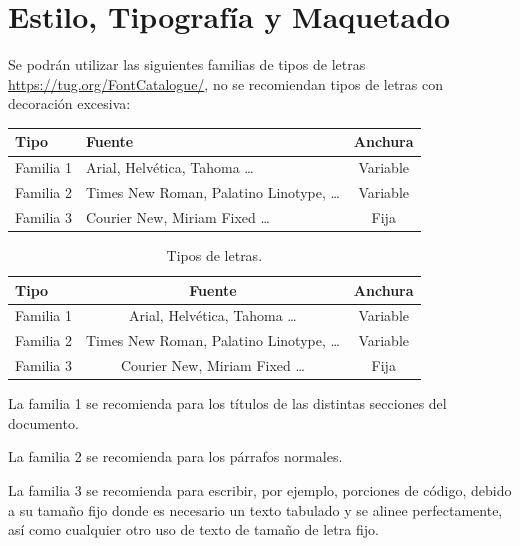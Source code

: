 \section {Estilo,  Tipografía y    Maquetado}

Se podrán utilizar las siguientes familias de tipos de letras \url{https://tug.org/FontCatalogue/}, no se recomiendan tipos de letras con decoración excesiva:

	\begin{center}
	\begin{tabular}{p{2cm}p{7.5cm}c}
		\textbf{Tipo} & \textbf{Fuente} & \textbf{Anchura} \\ \hline
         Familia 1 & Arial, Helvética, Tahoma  	\ldots & Variable \\
         Familia 2 & Times New Roman, Palatino  Linotype,  	\ldots & Variable  \\
         Familia 3 & Courier  New,  Miriam Fixed \ldots & Fija\\
         \hline
	\end{tabular}
	\end{center}



\begin{table} 
	\begin{center}
	\begin{tabular}{l c c}
		\textbf{Tipo} & \textbf{Fuente} & \textbf{Anchura} \\ \hline
         Familia 1 & Arial, Helvética, Tahoma  	\ldots & Variable \\
         Familia 2 & Times New Roman, Palatino  Linotype,  	\ldots & Variable  \\
         Familia 3 & Courier  New,  Miriam Fixed \ldots & Fija \\
         \hline
	\end{tabular}
	\end{center}

	\caption{\label{tab:letras}Tipos de letras.}
\end{table}


La familia 1 se recomienda para los títulos de las distintas secciones del documento.

La familia 2 se recomienda para los párrafos normales.

La familia 3 se recomienda para escribir, por ejemplo, porciones de código, debido a su tamaño fijo donde es necesario un texto tabulado y se alinee perfectamente, así como cualquier otro uso de texto de tamaño de letra fijo.

